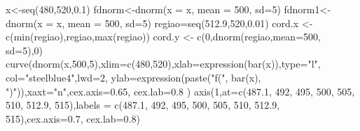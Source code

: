 \documentclass[
  letterpaper,
  DIV=11,
  numbers=noendperiod]{scrartcl}
\newenvironment{Shaded}{\begin{snugshade}}{\end{snugshade}}
\newcommand{\AttributeTok}[1]{\textcolor[rgb]{0.40,0.45,0.13}{#1}}
\newcommand{\DecValTok}[1]{\textcolor[rgb]{0.68,0.00,0.00}{#1}}
\newcommand{\FloatTok}[1]{\textcolor[rgb]{0.68,0.00,0.00}{#1}}
\newcommand{\FunctionTok}[1]{\textcolor[rgb]{0.28,0.35,0.67}{#1}}
\newcommand{\NormalTok}[1]{\textcolor[rgb]{0.00,0.23,0.31}{#1}}
\newcommand{\OtherTok}[1]{\textcolor[rgb]{0.00,0.23,0.31}{#1}}
\newcommand{\StringTok}[1]{\textcolor[rgb]{0.13,0.47,0.30}{#1}}
\begin{document}
\begin{Shaded}
\begin{Highlighting}[]
\NormalTok{x}\OtherTok{\textless{}{-}}\FunctionTok{seq}\NormalTok{(}\DecValTok{480}\NormalTok{,}\DecValTok{520}\NormalTok{,}\FloatTok{0.1}\NormalTok{) }
\NormalTok{fdnorm}\OtherTok{\textless{}{-}}\FunctionTok{dnorm}\NormalTok{(}\AttributeTok{x =}\NormalTok{ x, }\AttributeTok{mean =} \DecValTok{500}\NormalTok{, }\AttributeTok{sd=}\DecValTok{5}\NormalTok{)  }
\NormalTok{fdnorm1}\OtherTok{\textless{}{-}}\FunctionTok{dnorm}\NormalTok{(}\AttributeTok{x =}\NormalTok{ x, }\AttributeTok{mean =} \DecValTok{500}\NormalTok{, }\AttributeTok{sd=}\DecValTok{5}\NormalTok{)}
\NormalTok{regiao}\OtherTok{=}\FunctionTok{seq}\NormalTok{(}\FloatTok{512.9}\NormalTok{,}\DecValTok{520}\NormalTok{,}\FloatTok{0.01}\NormalTok{)}
\NormalTok{cord.x }\OtherTok{\textless{}{-}} \FunctionTok{c}\NormalTok{(}\FunctionTok{min}\NormalTok{(regiao),regiao,}\FunctionTok{max}\NormalTok{(regiao))}
\NormalTok{cord.y }\OtherTok{\textless{}{-}} \FunctionTok{c}\NormalTok{(}\DecValTok{0}\NormalTok{,}\FunctionTok{dnorm}\NormalTok{(regiao,}\AttributeTok{mean=}\DecValTok{500}\NormalTok{, }\AttributeTok{sd=}\DecValTok{5}\NormalTok{),}\DecValTok{0}\NormalTok{) }
\FunctionTok{curve}\NormalTok{(}\FunctionTok{dnorm}\NormalTok{(x,}\DecValTok{500}\NormalTok{,}\DecValTok{5}\NormalTok{),}\AttributeTok{xlim=}\FunctionTok{c}\NormalTok{(}\DecValTok{480}\NormalTok{,}\DecValTok{520}\NormalTok{),}\AttributeTok{xlab=}\FunctionTok{expression}\NormalTok{(}\FunctionTok{bar}\NormalTok{(x)),}\AttributeTok{type=}\StringTok{"l"}\NormalTok{,}
      \AttributeTok{col=}\StringTok{"steelblue4"}\NormalTok{,}\AttributeTok{lwd=}\DecValTok{2}\NormalTok{, }\AttributeTok{ylab=}\FunctionTok{expression}\NormalTok{(}\FunctionTok{paste}\NormalTok{(}\StringTok{"f("}\NormalTok{, }\FunctionTok{bar}\NormalTok{(x),}
      \StringTok{")"}\NormalTok{)),}\AttributeTok{xaxt=}\StringTok{"n"}\NormalTok{,}\AttributeTok{cex.axis=}\FloatTok{0.65}\NormalTok{, }\AttributeTok{cex.lab=}\FloatTok{0.8}\NormalTok{ ) }
\FunctionTok{axis}\NormalTok{(}\DecValTok{1}\NormalTok{,}\AttributeTok{at=}\FunctionTok{c}\NormalTok{(}\FloatTok{487.1}\NormalTok{, }\DecValTok{492}\NormalTok{, }\DecValTok{495}\NormalTok{, }\DecValTok{500}\NormalTok{, }\DecValTok{505}\NormalTok{, }\DecValTok{510}\NormalTok{, }\FloatTok{512.9}\NormalTok{, }\DecValTok{515}\NormalTok{),}\AttributeTok{labels =}
       \FunctionTok{c}\NormalTok{(}\FloatTok{487.1}\NormalTok{, }\DecValTok{492}\NormalTok{, }\DecValTok{495}\NormalTok{, }\DecValTok{500}\NormalTok{, }\DecValTok{505}\NormalTok{, }\DecValTok{510}\NormalTok{, }\FloatTok{512.9}\NormalTok{, }\DecValTok{515}\NormalTok{),}\AttributeTok{cex.axis=}\FloatTok{0.7}\NormalTok{, }\AttributeTok{cex.lab=}\FloatTok{0.8}\NormalTok{) }

\end{Highlighting}
\end{Shaded}
\end{document}
